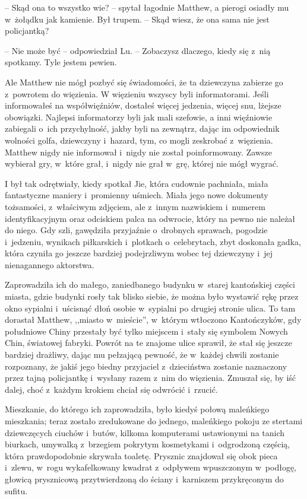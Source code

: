 \documentclass[oneside,polish,11pt,rmheadings]{mwbk}
\begin{document}
-- Skąd ona to wszystko wie? -- spytał łagodnie Matthew, a pierogi osiadły mu w~żołądku jak kamienie. Był trupem. -- Skąd wiesz, że ona sama nie jest policjantką?

-- Nie może być -- odpowiedział Lu. -- Zobaczysz dlaczego, kiedy się z~nią spotkamy. Tyle jestem pewien.

Ale Matthew nie mógł pozbyć się świadomości, że ta dziewczyna zabierze go z~powrotem do więzienia. W więzieniu wszyscy byli informatorami. Jeśli informowałeś na współwięźniów, dostałeś więcej jedzenia, więcej snu, lżejsze obowiązki. Najlepsi informatorzy byli jak mali szefowie, a inni więźniowie zabiegali o~ich przychylność, jakby byli na zewnątrz, dając im odpowiednik wolności golfa, dziewczyny i~hazard, tym, co mogli zeskrobać z~więzienia. Matthew nigdy nie informował i~nigdy nie został poinformowany. Zawsze wybierał gry, w~które grał, i~nigdy nie grał w~grę, której nie mógł wygrać.

I był tak odrętwiały, kiedy spotkał Jie, która cudownie pachniała, miała fantastyczne maniery i~promienny uśmiech. Miała jego nowe dokumenty tożsamości, z~właściwym zdjęciem, ale z~innym nazwiskiem i~numerem identyfikacyjnym oraz odciskiem palca na odwrocie, który na pewno nie należał do niego. Gdy szli, gawędziła przyjaźnie o~drobnych sprawach, pogodzie i~jedzeniu, wynikach piłkarskich i~plotkach o~celebrytach, zbyt doskonała gadka, która czyniła go jeszcze bardziej podejrzliwym wobec tej dziewczyny i~jej nienagannego aktorstwa.

Zaprowadziła ich do małego, zaniedbanego budynku w~starej kantońskiej części miasta, gdzie budynki rosły tak blisko siebie, że można było wystawić rękę przez okno sypialni i~uścisnąć dłoń osobie w~sypialni po drugiej stronie ulica. To tam dorastał Matthew, ,,miasto w~mieście'', w~którym wtłoczono Kantończyków, gdy południowe Chiny przestały być tylko miejscem i~stały się symbolem Nowych Chin, światowej fabryki. Powrót na te znajome ulice sprawił, że stał się jeszcze bardziej drażliwy, dając mu pełzającą pewność, że w~każdej chwili zostanie rozpoznany, że jakiś jego biedny przyjaciel z~dzieciństwa zostanie naznaczony przez tajną policjantkę i~wysłany razem z~nim do więzienia. Zmuszał się, by iść dalej, choć z~każdym krokiem chciał się odwrócić i~rzucić.

Mieszkanie, do którego ich zaprowadziła, było kiedyś połową maleńkiego mieszkania; teraz zostało zredukowane do jednego, maleńkiego pokoju ze stertami dziewczęcych ciuchów i~butów, kilkoma komputerami ustawionymi na tanich biurkach, umywalką z~brzegiem pokrytym kosmetykami i~odgrodzoną częścią, która prawdopodobnie skrywała toaletę. Prysznic znajdował się obok pieca i~zlewu, w~rogu wykafelkowany kwadrat z~odpływem wpuszczonym w~podłogę, głowicą prysznicową przytwierdzoną do ściany i~karniszem przykręconym do sufitu.
\end{document}
